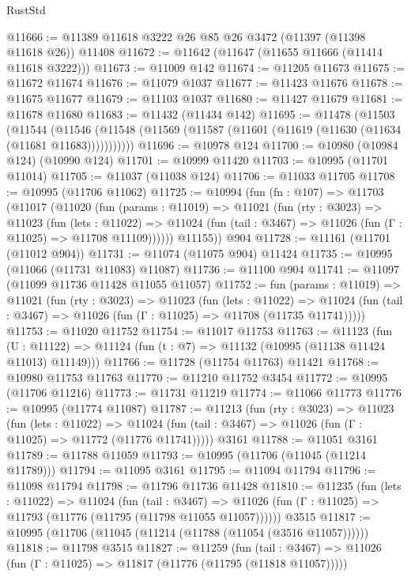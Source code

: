 \begin{lexlean}{RustStd}
\begin{coremodule}
@11666 := @11389 @11618 @3222 @26 @85 @26 @3472 (@11397 (@11398 @11618 @26)) @11408
@11672 := @11642 (@11647 (@11655 @11666 (@11414 @11618 @3222)))
@11673 := @11009 @142
@11674 := @11205 @11673
@11675 := @11672 @11674
@11676 := @11079 @1037
@11677 := @11423 @11676
@11678 := @11675 @11677
@11679 := @11103 @1037
@11680 := @11427 @11679
@11681 := @11678 @11680
@11683 := @11432 (@11434 @142)
@11695 := @11478
    (@11503
      (@11544
        (@11546 (@11548 (@11569 (@11587 (@11601 (@11619 (@11630 (@11634 (@11681 @11683)))))))))))
@11696 := @10978 @124
@11700 := @10980 (@10984 @124) (@10990 @124)
@11701 := @10999 @11420
@11703 := @10995 (@11701 @11014)
@11705 := @11037 (@11038 @124)
@11706 := @11033 @11705
@11708 := @10995 (@11706 @11062)
@11725 := @10994
    (fun (fn : @107) =>
    @11703
      (@11017
        (@11020
          (fun (params : @11019) =>
          @11021
            (fun (rty : @3023) =>
            @11023
              (fun (lets : @11022) =>
              @11024 (fun (tail : @3467) => @11026 (fun (Γ : @11025) => @11708 @11109))))))
        @11155))
    @904
@11728 := @11161 (@11701 (@11012 @904))
@11731 := @11074 (@11075 @904) @11424
@11735 := @10995 (@11066 (@11731 @11083) @11087)
@11736 := @11100 @904
@11741 := @11097 (@11099 @11736 @11428 @11055 @11057)
@11752 := fun (params : @11019) =>
  @11021
    (fun (rty : @3023) =>
    @11023
      (fun (lets : @11022) =>
      @11024 (fun (tail : @3467) => @11026 (fun (Γ : @11025) => @11708 (@11735 @11741)))))
@11753 := @11020 @11752
@11754 := @11017 @11753
@11763 := @11123
    (fun (U : @11122) => @11124 (fun (t : @7) => @11132 (@10995 (@11138 @11424 @11013) @11149)))
@11766 := @11728 (@11754 @11763) @11421
@11768 := @10980 @11753 @11763
@11770 := @11210 @11752 @3454
@11772 := @10995 (@11706 @11216)
@11773 := @11731 @11219
@11774 := @11066 @11773
@11776 := @10995 (@11774 @11087)
@11787 := @11213
    (fun (rty : @3023) =>
    @11023
      (fun (lets : @11022) =>
      @11024 (fun (tail : @3467) => @11026 (fun (Γ : @11025) => @11772 (@11776 @11741)))))
    @3161
@11788 := @11051 @3161
@11789 := @11788 @11059
@11793 := @10995 (@11706 (@11045 (@11214 @11789)))
@11794 := @11095 @3161
@11795 := @11094 @11794
@11796 := @11098 @11794
@11798 := @11796 @11736 @11428
@11810 := @11235
    (fun (lets : @11022) =>
    @11024
      (fun (tail : @3467) =>
      @11026 (fun (Γ : @11025) => @11793 (@11776 (@11795 (@11798 @11055 @11057))))))
    @3515
@11817 := @10995 (@11706 (@11045 (@11214 (@11788 (@11054 (@3516 @11057))))))
@11818 := @11798 @3515
@11827 := @11259
    (fun (tail : @3467) => @11026 (fun (Γ : @11025) => @11817 (@11776 (@11795 (@11818 @11057)))))

\end{coremodule}
\end{lexlean}
